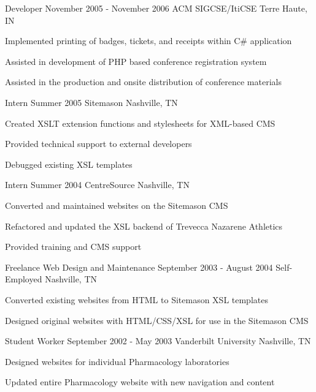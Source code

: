 {\begin{cventries}
  \cventry
  {Developer}
  {November 2005 - November 2006}
  {ACM SIGCSE/ItiCSE}
  {Terre Haute, IN}
  {
    \begin{cvitems}
      \item Implemented printing of badges, tickets, and receipts within C\# application
      \item Assisted in development of PHP based conference registration system
      \item Assisted in the production and onsite distribution of conference materials
    \end{cvitems}
    \cvtags{
      \tagCSharp
      \tagPHP
      \tagMSSQL
      \tagCustomerService
    }
  }

  \cventry
  {Intern}
  {Summer 2005}
  {Sitemason}
  {Nashville, TN}
  {
    \begin{cvitems}
      \item Created XSLT extension functions and stylesheets for XML-based CMS
      \item Provided technical support to external developers
      \item Debugged existing XSL templates
    \end{cvitems}
    \cvtags{
      \tagCSS
      \tagHTML
      \tagJavaScript
      \tagXML
      \tagXSLT
    }
  }

  \cventry
  {Intern}
  {Summer 2004}
  {CentreSource}
  {Nashville, TN}
  {
    \begin{cvitems}
      \item Converted and maintained websites on the Sitemason CMS
      \item Refactored and updated the XSL backend of Trevecca Nazarene Athletics
      \item Provided training and CMS support
    \end{cvitems}
    \cvtags{
      \tagCSS
      \tagHTML
      \tagJavaScript
      \tagXML
      \tagXSLT
    }
  }

  \cventry
  {Freelance Web Design and Maintenance}
  {September 2003 - August 2004}
  {Self-Employed}
  {Nashville, TN}
  {
    \begin{cvitems}
      \item Converted existing websites from HTML to Sitemason XSL templates
      \item Designed original websites with HTML/CSS/XSL for use in the Sitemason CMS
    \end{cvitems}
    \cvtags{
      \tagCSS
      \tagHTML
      \tagJavaScript
      \tagXML
      \tagXSLT
      \tagProjectManagement
    }
  }

  \cventry
  {Student Worker}
  {September 2002 - May 2003}
  {Vanderbilt University}
  {Nashville, TN}
  {
    \begin{cvitems}
      \item Designed websites for individual Pharmacology laboratories
      \item Updated entire Pharmacology website with new navigation and content
    \end{cvitems}
    \cvtags{
      \tagCSS
      \tagHTML
      \tagJavaScript
      \tagDreamweaver
      \tagPhotoshop
    }
  }
\end{cventries}
}{}
